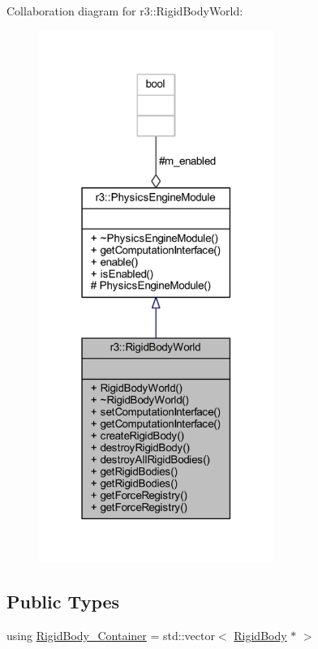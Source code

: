 Collaboration diagram for r3\+:\+:Rigid\+Body\+World\+:\nopagebreak
\begin{figure}[H]
\begin{center}
\leavevmode
\includegraphics[width=217pt]{classr3_1_1_rigid_body_world__coll__graph}
\end{center}
\end{figure}
\subsection*{Public Types}
\begin{DoxyCompactItemize}
\item 
using \mbox{\hyperlink{classr3_1_1_rigid_body_world_abe8c123eee198b6f8eca079e71302bcb}{Rigid\+Body\+\_\+\+Container}} = std\+::vector$<$ \mbox{\hyperlink{classr3_1_1_rigid_body}{Rigid\+Body}} $\ast$ $>$
\end{DoxyCompactItemize}
